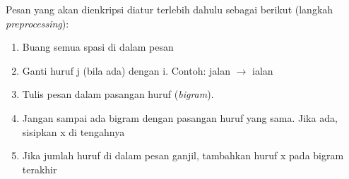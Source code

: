 \documentclass{article}
\begin{document}

Pesan yang akan dienkripsi diatur terlebih dahulu sebagai berikut (langkah \textit{preprocessing}):

\begin{enumerate}
  \item Buang semua spasi di dalam pesan
  \item Ganti huruf j (bila ada) dengan i. Contoh: jalan $\rightarrow$ ialan
  \item Tulis pesan dalam pasangan huruf (\textit{bigram}).
  \item Jangan sampai ada bigram dengan pasangan huruf yang sama. Jika ada, sisipkan x di tengahnya
  \item Jika jumlah huruf di dalam pesan ganjil, tambahkan huruf x pada bigram terakhir
\end{enumerate}
\end{document}
